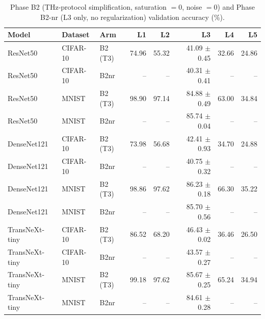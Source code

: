 \begin{table}[htbp]
\centering
\caption{Phase B2 (THz-protocol simplification, saturation $=0$, noise $=0$) and Phase B2-nr (L3 only, no regularization) validation accuracy (\%).}
\label{tab:phase_b2}
\setlength{\tabcolsep}{4pt}
\renewcommand{\arraystretch}{1.1}
\begin{tabular}{lllrrrrr}
\toprule
Model & Dataset & Arm & L1 & L2 & L3 & L4 & L5 \\
\midrule
ResNet50 & CIFAR-10 & B2 (T3) & 74.96 & 55.32 & 41.09 $\pm$ 0.45 & 32.66 & 24.86 \\
ResNet50 & CIFAR-10 & B2nr & -- & -- & 40.31 $\pm$ 0.41 & -- & -- \\
ResNet50 & MNIST & B2 (T3) & 98.90 & 97.14 & 84.88 $\pm$ 0.49 & 63.00 & 34.84 \\
ResNet50 & MNIST & B2nr & -- & -- & 85.74 $\pm$ 0.04 & -- & -- \\
DenseNet121 & CIFAR-10 & B2 (T3) & 73.98 & 56.68 & 42.41 $\pm$ 0.93 & 34.70 & 24.88 \\
DenseNet121 & CIFAR-10 & B2nr & -- & -- & 40.75 $\pm$ 0.32 & -- & -- \\
DenseNet121 & MNIST & B2 (T3) & 98.86 & 97.62 & 86.23 $\pm$ 0.18 & 66.30 & 35.22 \\
DenseNet121 & MNIST & B2nr & -- & -- & 85.70 $\pm$ 0.56 & -- & -- \\
TransNeXt-tiny & CIFAR-10 & B2 (T3) & 86.52 & 68.20 & 46.43 $\pm$ 0.02 & 36.46 & 26.50 \\
TransNeXt-tiny & CIFAR-10 & B2nr & -- & -- & 43.57 $\pm$ 0.27 & -- & -- \\
TransNeXt-tiny & MNIST & B2 (T3) & 99.18 & 97.62 & 85.67 $\pm$ 0.25 & 65.24 & 34.94 \\
TransNeXt-tiny & MNIST & B2nr & -- & -- & 84.61 $\pm$ 0.28 & -- & -- \\
\bottomrule
\end{tabular}
\end{table}
